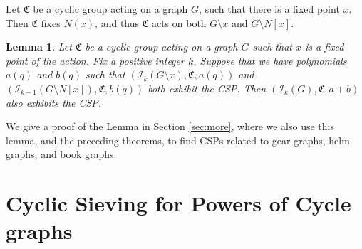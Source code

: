 \documentclass[12pt]{article}
\newtheorem{theorem}{Theorem}%
\newtheorem{lemma}[theorem]{Lemma}
\theoremstyle{definition}
\begin{document}
Let $\mathfrak{C}$ be a cyclic group acting on a graph $G$, such that there is a fixed point $x$. Then $\mathfrak{C}$ fixes $N(x)$, and thus $\mathfrak{C}$ acts on both $G \setminus x$ and $G \setminus N[x]$.
\begin{lemma}
    Let $\mathfrak{C}$ be a cyclic group acting on a graph $G$ such that $x$ is a fixed point of the action. Fix a positive integer $k$. Suppose that we have polynomials $a(q)$ and $b(q)$ such that $(\mathcal{I}_{k}(G \setminus x), \mathfrak{C}, a(q))$ and $(\mathcal{I}_{k-1}(G \setminus N[x]), \mathfrak{C}, b(q))$ both exhibit the CSP. Then $(\mathcal{I}_k(G), \mathfrak{C}, a+b)$ also exhibits the CSP.
    \label{lem:recurse}
\end{lemma}
We give a proof of the Lemma in Section \ref{sec:more}, where we also use this lemma, and the preceding theorems, to find CSPs related to gear graphs, helm graphs, and book graphs. 



\section{Cyclic Sieving for Powers of Cycle graphs}
\label{sec:main}
\end{document}

